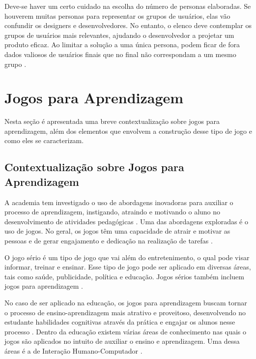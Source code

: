 Deve-se haver um certo cuidado na escolha do número de personas elaboradas. \cite{Courage_Baxter_2005} Se houverem muitas personas para representar os grupos de usuários, elas vão confundir os designers e desenvolvedores. No entanto, o elenco deve contemplar os grupos de usuários mais relevantes, ajudando o desenvolvedor a projetar um produto eficaz. Ao limitar a solução a uma única persona, podem ficar de fora dados valiosos de usuários finais que no final não correspondam a um mesmo grupo \cite[p. 155]{BarbosaEtAl2021}.

\section{Jogos para Aprendizagem}
\label{sec:jogos-aprend}

Nesta seção é apresentada uma breve contextualização sobre jogos para aprendizagem, além dos elementos que envolvem a construção desse tipo de jogo e como eles se caracterizam. 
\subsection{Contextualização sobre Jogos para Aprendizagem}

A academia tem investigado o uso de abordagens inovadoras para auxiliar o processo de aprendizagem, instigando, atraindo e motivando o aluno no desenvolvimento de atividades pedagógicas \cite{battistella, brito, Sales2020}. Uma das abordagens exploradas é o uso de jogos. No geral, os jogos têm uma capacidade de atrair e motivar as pessoas e de gerar engajamento e dedicação na realização de tarefas \cite{Vianna_Vianna_Medina_Tanaka_Krug_2013}. 

O jogo sério é um tipo de jogo que vai além do entretenimento, o qual pode visar informar, treinar e ensinar. Esse tipo de jogo pode ser aplicado em diversas áreas, tais como saúde, publicidade, política e educação. Jogos sérios também incluem jogos para aprendizagem \cite{Becker_2021}.

No caso de ser aplicado na educação, os jogos para aprendizagem buscam tornar o processo de ensino-aprendizagem mais atrativo e proveitoso, desenvolvendo no estudante habilidades cognitivas através da prática e engajar os alunos nesse processo \cite{sommariva, queiroz, darin}. Dentro da educação existem várias áreas de conhecimento nas quais o jogos são aplicados no intuito de auxiliar o ensino e aprendizagem. Uma dessa áreas é a de Interação Humano-Computador \cite{Sales2020, Sales2020UsoTDS}. 

